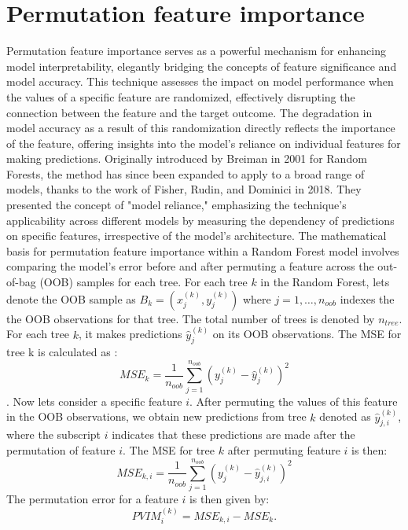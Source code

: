 \documentclass[12pt]{article}
\begin{document}
\section{Permutation feature importance}
Permutation feature importance serves as a powerful mechanism for enhancing model interpretability, elegantly bridging the concepts of feature significance and model accuracy.
This technique assesses the impact on model performance when the values of a specific feature are randomized, effectively disrupting the connection between the feature and the target outcome. The degradation in model accuracy as a result of this randomization directly reflects the importance of the feature, offering insights into the model's reliance on individual features for making predictions.
Originally introduced by Breiman in 2001 for Random Forests, the method has since been expanded to apply to a broad range of models, thanks to the work of Fisher, Rudin, and Dominici in 2018. They presented the concept of "model reliance," emphasizing the technique's applicability across different models by measuring the dependency of predictions on specific features, irrespective of the model's architecture.
The mathematical basis for permutation feature importance within a Random Forest model involves comparing the model's error before and after permuting a feature across the out-of-bag (OOB) samples for each tree. 
For each tree $k$ in the Random Forest, lets denote the OOB sample as $B_k=(x^{(k)}_j,y^{(k)}_j)$ where $j=1,\ldots,n_{oob}$ indexes the the OOB observations for that tree. The total number of trees is denoted by $n_{tree}$. For each tree $k$, it makes predictions $\hat{y}^{(k)}_j$ on its OOB observations. The MSE for tree k is calculated as : 
$$MSE_k = \frac{1}{n_{oob}}\sum_{j=1}^{n_{oob}}(y^{(k)}_j-\hat{y}^{(k)}_j)^2$$. Now lets consider a specific feature $i$. After permuting the values of this feature in the OOB observations, we obtain new predictions from tree $k$ denoted as $\hat{y}^{(k)}_{j,i}$, where the subscript $i$ indicates that these predictions are made after the permutation of feature $i$. The MSE for tree $k$ after permuting feature $i$ is then: 
$$MSE_{k,i} = \frac{1}{n_{oob}}\sum_{j=1}^{n_{oob}}(y^{(k)}_j-\hat{y}^{(k)}_{j,i})^2$$
The permutation error for a feature $i$ is then given by:
$$PVIM^{(k)}_i=MSE_{k,i}-MSE_k.$$
\end{document}
